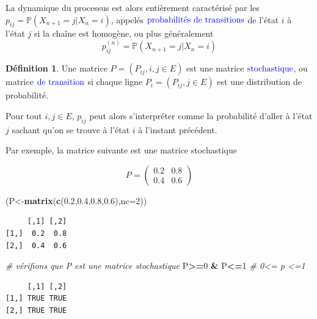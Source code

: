 \documentclass[
]{book}
\newenvironment{Shaded}{\begin{snugshade}}{\end{snugshade}}
\newcommand{\CommentTok}[1]{\textcolor[rgb]{0.56,0.35,0.01}{\textit{#1}}}
\newcommand{\DataTypeTok}[1]{\textcolor[rgb]{0.13,0.29,0.53}{#1}}
\newcommand{\DecValTok}[1]{\textcolor[rgb]{0.00,0.00,0.81}{#1}}
\newcommand{\FloatTok}[1]{\textcolor[rgb]{0.00,0.00,0.81}{#1}}
\newcommand{\KeywordTok}[1]{\textcolor[rgb]{0.13,0.29,0.53}{\textbf{#1}}}
\newcommand{\NormalTok}[1]{#1}
\newcommand{\OperatorTok}[1]{\textcolor[rgb]{0.81,0.36,0.00}{\textbf{#1}}}
\newcommand{\StringTok}[1]{\textcolor[rgb]{0.31,0.60,0.02}{#1}}
\theoremstyle{definition}
\newtheorem{definition}{Définition}[chapter]
\theoremstyle{definition}
\theoremstyle{definition}
\theoremstyle{remark}
\begin{document}
La dynamique du processus est alors entièrement caractérisé par les \(p_{ij}=\mathbb{P}(X_{n+1}=j|X_n=i)\), appelés \(\color{blue}{\mathbf{\text{probabilités de transitions}}}\) de l'état \(i\) à l'état \(j\) si la chaîne est homogène, ou plus généralement
\[ p_{ij}^{(n)}=\mathbb{P}(X_{n+1}=j|X_n=i)\]
\begin{definition}
\protect\hypertarget{def:unnamed-chunk-24}{}{\label{def:unnamed-chunk-24} }Une matrice \(P=(P_{ij},i,j \in E)\) est une matrice \(\color{blue}{\mathbf{\text{stochastique}}}\), ou matrice \(\color{blue}{\mathbf{\text{de transition}}}\) si chaque ligne \(P_i=(P_{ij}, j \in E)\) est une distribution de probabilité.
\end{definition}

Pour tout \(i,j \in E\), \(p_{ij}\) peut alors s'interpréter comme la probabilité d'aller à l'état \(j\) sachant qu'on se trouve à l'état \(i\) à l'instant précédent.

Par exemple, la matrice suivante est une matrice stochastique

\[
P=\left( 
\begin{array}{cc}
0.2 & 0.8\\
0.4 & 0.6
\end{array}
\right)
\]

\begin{Shaded}
\begin{Highlighting}[]
\NormalTok{(P<-}\KeywordTok{matrix}\NormalTok{(}\KeywordTok{c}\NormalTok{(}\FloatTok{0.2}\NormalTok{,}\FloatTok{0.4}\NormalTok{,}\FloatTok{0.8}\NormalTok{,}\FloatTok{0.6}\NormalTok{),}\DataTypeTok{nc=}\DecValTok{2}\NormalTok{))}
\end{Highlighting}
\end{Shaded}

\begin{verbatim}
     [,1] [,2]
[1,]  0.2  0.8
[2,]  0.4  0.6
\end{verbatim}

\begin{Shaded}
\begin{Highlighting}[]
\CommentTok{# vérifions que P est une matrice stochastique}
\NormalTok{P}\OperatorTok{>=}\DecValTok{0} \OperatorTok{&}\StringTok{ }\NormalTok{P}\OperatorTok{<=}\DecValTok{1}  \CommentTok{# 0<= p <=1}
\end{Highlighting}
\end{Shaded}

\begin{verbatim}
     [,1] [,2]
[1,] TRUE TRUE
[2,] TRUE TRUE
\end{verbatim}
\end{document}
